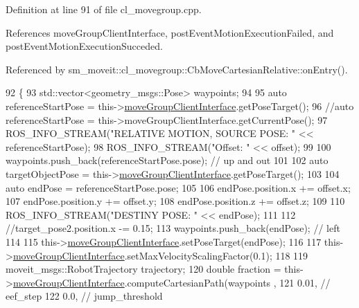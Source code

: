 Definition at line 91 of file cl\+\_\+movegroup.\+cpp.



References move\+Group\+Client\+Interface, post\+Event\+Motion\+Execution\+Failed, and post\+Event\+Motion\+Execution\+Succeded.



Referenced by sm\+\_\+moveit\+::cl\+\_\+movegroup\+::\+Cb\+Move\+Cartesian\+Relative\+::on\+Entry().


\begin{DoxyCode}
92 \{
93     std::vector<geometry\_msgs::Pose> waypoints;
94 
95     \textcolor{keyword}{auto} referenceStartPose = this->\hyperlink{classsm__moveit_1_1cl__movegroup_1_1ClMoveGroup_a23acf6883455566dbab30e4367c2144d}{moveGroupClientInterface}.getPoseTarget();
96     \textcolor{comment}{//auto referenceStartPose = this->moveGroupClientInterface.getCurrentPose();}
97     ROS\_INFO\_STREAM(\textcolor{stringliteral}{"RELATIVE MOTION, SOURCE POSE: "} << referenceStartPose);
98         ROS\_INFO\_STREAM(\textcolor{stringliteral}{"Offset: "} << offset);
99 
100     waypoints.push\_back(referenceStartPose.pose); \textcolor{comment}{// up and out}
101 
102     \textcolor{keyword}{auto} targetObjectPose = this->\hyperlink{classsm__moveit_1_1cl__movegroup_1_1ClMoveGroup_a23acf6883455566dbab30e4367c2144d}{moveGroupClientInterface}.getPoseTarget();
103 
104     \textcolor{keyword}{auto} endPose = referenceStartPose.pose;
105 
106     endPose.position.x += offset.x;
107     endPose.position.y += offset.y;
108     endPose.position.z += offset.z;
109 
110     ROS\_INFO\_STREAM(\textcolor{stringliteral}{"DESTINY POSE: "} << endPose);
111 
112     \textcolor{comment}{//target\_pose2.position.x -= 0.15;}
113     waypoints.push\_back(endPose); \textcolor{comment}{// left}
114 
115     this->\hyperlink{classsm__moveit_1_1cl__movegroup_1_1ClMoveGroup_a23acf6883455566dbab30e4367c2144d}{moveGroupClientInterface}.setPoseTarget(endPose);
116 
117     this->\hyperlink{classsm__moveit_1_1cl__movegroup_1_1ClMoveGroup_a23acf6883455566dbab30e4367c2144d}{moveGroupClientInterface}.setMaxVelocityScalingFactor(0.1);
118 
119     moveit\_msgs::RobotTrajectory trajectory;
120     \textcolor{keywordtype}{double} fraction = this->\hyperlink{classsm__moveit_1_1cl__movegroup_1_1ClMoveGroup_a23acf6883455566dbab30e4367c2144d}{moveGroupClientInterface}.computeCartesianPath(waypoints
      ,
121                                                                           0.01, \textcolor{comment}{// eef\_step}
122                                                                           0.0,  \textcolor{comment}{// jump\_threshold}

\end{DoxyCode}
